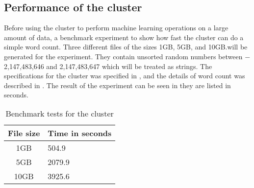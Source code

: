 \subsection{Performance of the cluster}\label{sec:benchmark}
Before using the cluster to perform machine learning operations on a large amount of data, a benchmark experiment to show how fast the cluster can do a simple word count. Three different files of the sizes 1GB, 5GB, and 10GB.\@ will be generated for the experiment. They contain unsorted random numbers between $-$2,147,483,646 and 2,147,483,647 which will be treated as strings. The specifications for the cluster was specified in , and the details of word count was described in . The result of the experiment can be seen in  they are listed in seconds. 
\begin{table}[!htb]
  \centering
  \begin{tabular}{|c|l|}
    \hline
    File size & Time in seconds \\
    \hline
    1GB & 504.9  \\ %
    5GB & 2079.9 \\ %
    10GB & 3925.6 \\ %
    \hline
  \end{tabular}
  \caption{Benchmark tests for the cluster}
  \label{tab:bench}
\end{table}

